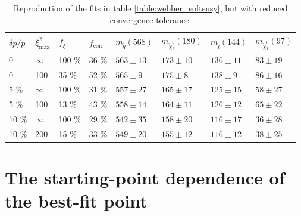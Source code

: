 \documentclass[twoside,english]{uiofysmaster}
\begin{document}
\begin{table}[hbt]
	\centering
	\begin{tabular}{| l | l | l | l  || l | l | l | l |}
		\hline
		$\delta p/p$ & $\xi^2_\mathrm{max}$ & $f_\xi$ & $f_\mathrm{corr}$ & $m_{\tilde q} (568)$ & $m_{\tilde \chi_2^0} (180)$ & $m_{\tilde l} (144)$ & $m_{\tilde \chi_1^0} (97)$ \\
		\hline \hline
		0 & 	$\infty$ &	100 \%	& 36 \%	& $563 \pm 13$	&	$173 \pm 10$	&	$136 \pm 11$	& 	$83 \pm 19$	\\
		0 &		100 &		35 \%	& 52 \% & $565 \pm 9$	&	$175 \pm 8$		&	$138 \pm 9$	&	$86 \pm 16$	\\
		5 \% &	$\infty$ &	100 \%	& 31 \% & $557 \pm 27$	& 	$165 \pm 17$	&	$125 \pm 15$&	$58 \pm 27$ \\
		5 \% &	100 &		13 \%	& 43 \% & $558 \pm 14$	&	$164 \pm 11$	& 	$126 \pm 12$	&	$65 \pm 22$	\\
		10 \% &	$\infty$ &	100 \%	& 29 \% & $542 \pm 35$	&	$158 \pm 20$	&	$116 \pm 17$&	$36 \pm 28$	\\
		10 \% &	200 &		15 \%	& 33 \% & $549 \pm 20$	& 	$155 \pm 12$	&	$116 \pm 12$&	$38 \pm 25$ \\
		\hline
	\end{tabular}
	\caption{Reproduction of the fits in table \ref{table:webber_softsusy}, but with reduced convergence tolerance.}
	\label{table:webber_rec_lowtol}
\end{table}

\section{The starting-point dependence of the best-fit point}
\label{sec:SP-dependence_webber}
\end{document}
